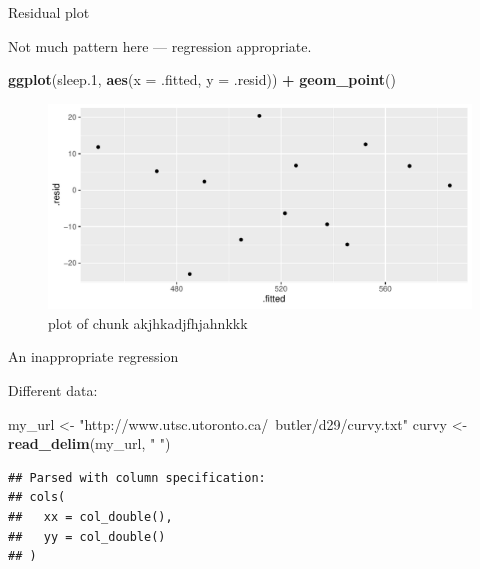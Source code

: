 \documentclass[ignorenonframetext,]{beamer}
\newenvironment{Shaded}{\begin{snugshade}}{\end{snugshade}}
\newcommand{\DataTypeTok}[1]{\textcolor[rgb]{0.13,0.29,0.53}{#1}}
\newcommand{\FloatTok}[1]{\textcolor[rgb]{0.00,0.00,0.81}{#1}}
\newcommand{\KeywordTok}[1]{\textcolor[rgb]{0.13,0.29,0.53}{\textbf{#1}}}
\newcommand{\NormalTok}[1]{#1}
\newcommand{\OperatorTok}[1]{\textcolor[rgb]{0.81,0.36,0.00}{\textbf{#1}}}
\newcommand{\StringTok}[1]{\textcolor[rgb]{0.31,0.60,0.02}{#1}}
\begin{document}
\begin{frame}[fragile]{Residual plot}
\protect\hypertarget{residual-plot}{}

Not much pattern here --- regression appropriate.

\begin{Shaded}
\begin{Highlighting}[]
\KeywordTok{ggplot}\NormalTok{(sleep}\FloatTok{.1}\NormalTok{, }\KeywordTok{aes}\NormalTok{(}\DataTypeTok{x =}\NormalTok{ .fitted, }\DataTypeTok{y =}\NormalTok{ .resid)) }\OperatorTok{+}\StringTok{ }\KeywordTok{geom_point}\NormalTok{()}
\end{Highlighting}
\end{Shaded}

\begin{figure}
\centering
\includegraphics{figure/akjhkadjfhjahnkkk-1.pdf}
\caption{plot of chunk akjhkadjfhjahnkkk}
\end{figure}

\end{frame}

\begin{frame}[fragile]{An inappropriate regression}
\protect\hypertarget{an-inappropriate-regression}{}

Different data:

\begin{Shaded}
\begin{Highlighting}[]
\NormalTok{my_url <-}\StringTok{ "http://www.utsc.utoronto.ca/~butler/d29/curvy.txt"}
\NormalTok{curvy <-}\StringTok{ }\KeywordTok{read_delim}\NormalTok{(my_url, }\StringTok{" "}\NormalTok{)}
\end{Highlighting}
\end{Shaded}

\begin{verbatim}
## Parsed with column specification:
## cols(
##   xx = col_double(),
##   yy = col_double()
## )
\end{verbatim}

\end{frame}
\end{document}

